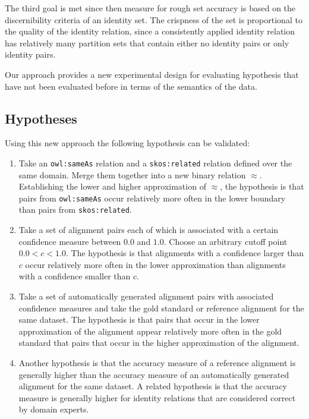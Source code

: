 \documentclass[letterpaper]{article}
\begin{document}
The third goal is met since then measure for rough set accuracy is based on the discernibility criteria of an identity set. The crispness of the set is proportional to the quality of the identity relation, since a consistently applied identity relation has relatively many partition sets that contain either no identity pairs or only identity pairs.

Our approach provides a new experimental design for evaluating hypothesis that have not been evaluated before in terms of the semantics of the data.

\subsection{Hypotheses}
\label{sec:hypotheses}

Using this new approach the following hypothesis can be validated:

\begin{enumerate}
\item Take an \verb|owl:sameAs| relation and a \verb|skos:related| relation defined over the same domain. Merge them together into a new binary relation $\approx$. Establishing the lower and higher approximation of $\approx$, the hypothesis is that pairs from \verb|owl:sameAs| occur relatively more often in the lower boundary  than pairs from \verb|skos:related|.
\item Take a set of alignment pairs each of which is associated with a certain confidence measure between $0.0$ and $1.0$. Choose an arbitrary cutoff point $0.0 < c < 1.0$. The hypothesis is that alignments with a confidence larger than $c$ occur relatively more often in the lower approximation than alignments with a confidence smaller than $c$.
\item Take a set of automatically generated alignment pairs with associated confidence measures and take the gold standard or reference alignment for the same dataset. The hypothesis is that pairs that occur in the lower approximation of the alignment appear relatively more often in the gold standard that pairs that occur in the higher approximation of the alignment.
\item Another hypothesis is that the accuracy measure of a reference alignment is generally higher than the accuracy measure of an automatically generated alignment for the same dataset. A related hypothesis is that the accuracy measure is generally higher for identity relations that are considered correct by domain experts.
\end{enumerate}
\end{document}
